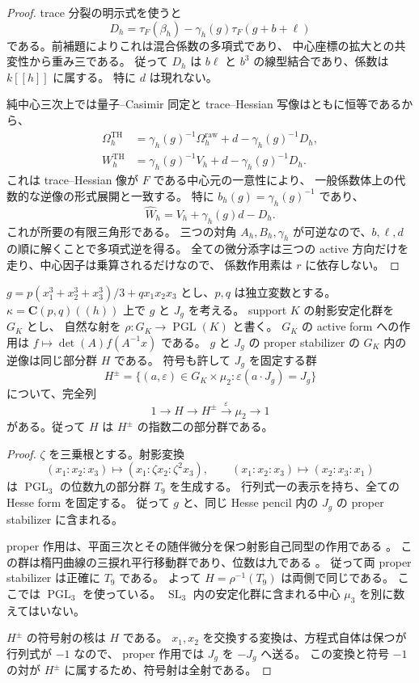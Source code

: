 \begin{proof}
trace 分裂の明示式を使うと
\[
 D_h=\tau_F(\beta_h)-\gamma_h(g)\tau_F(g+b+\ell)
\]
である。前補題によりこれは混合係数の多項式であり、
中心座標の拡大との共変性から重み三である。
従って $D_h$ は $b\ell$ と $b^3$ の線型結合であり、係数は $k[[h]]$ に属する。
特に $d$ は現れない。

純中心三次上では量子--Casimir 同定と trace--Hessian 写像はともに恒等であるから、
\[
 \begin{split}
 \Omega_h^{\mathrm{TH}}
 &=\gamma_h(g)^{-1}\Omega_h^{\mathrm{raw}}+d-\gamma_h(g)^{-1}D_h,\\
 W_h^{\mathrm{TH}}
 &=\gamma_h(g)^{-1}V_h+d-\gamma_h(g)^{-1}D_h.
 \end{split}
\]
これは trace--Hessian 像が $F$ である中心元の一意性により、
一般係数体上の代数的な逆像の形式展開と一致する。
特に $b_h(g)=\gamma_h(g)^{-1}$ であり、
\[
 \widehat W_h=V_h+\gamma_h(g)d-D_h.
\]
これが所要の有限三角形である。
三つの対角 $A_h,B_h,\gamma_h$ が可逆なので、$b,\ell,d$ の順に解くことで多項式逆を得る。
全ての微分添字は三つの active 方向だけを走り、中心因子は乗算されるだけなので、
係数作用素は $r$ に依存しない。
\end{proof}

\begin{lemma}
\label{lem:nfm-hesse-stabilizer-index-two}
$g=p(x_1^3+x_2^3+x_3^3)/3+qx_1x_2x_3$ とし、$p,q$ は独立変数とする。
$\kappa=\mathbf C(p,q)((h))$ 上で $g$ と $J_g$ を考える。
support $K$ の射影安定化群を $G_K$ とし、
自然な射を $\rho:G_K\to\operatorname{PGL}(K)$ と書く。
$G_K$ の active form への作用は $f\mapsto\det(A)f(A^{-1}x)$ である。
$g$ と $J_g$ の proper stabilizer の $G_K$ 内の逆像は同じ部分群 $H$ である。
符号も許して $J_g$ を固定する群
\[
 H^\pm=\{(a,\varepsilon)\in G_K\times\mu_2:
                 \varepsilon(a\cdot J_g)=J_g\}
\]
について、完全列
\[
 1\longrightarrow H\longrightarrow H^\pm
   \xrightarrow{\varepsilon}\mu_2\longrightarrow1
\]
がある。従って $H$ は $H^\pm$ の指数二の部分群である。
\end{lemma}

\begin{proof}
$\zeta$ を三乗根とする。射影変換
\[
 (x_1:x_2:x_3)\longmapsto(x_1:\zeta x_2:\zeta^2x_3),\qquad
 (x_1:x_2:x_3)\longmapsto(x_2:x_3:x_1)
\]
は $\operatorname{PGL}_3$ の位数九の部分群 $T_9$ を生成する。
行列式一の表示を持ち、全ての Hesse form を固定する。
従って $g$ と、同じ Hesse pencil 内の $J_g$ の proper stabilizer に含まれる。

proper 作用は、平面三次とその随伴微分を保つ射影自己同型の作用である
\cite[Theorem~2.5 and Lemma~2.6]{NFMFisherTernary}。
この群は楕円曲線の三捩れ平行移動群であり、位数は九である
\cite[proof of Lemma~2.3]{NFMFisherTernary}。
従って両 proper stabilizer は正確に $T_9$ である。
よって $H=\rho^{-1}(T_9)$ は両側で同じである。
ここでは $\operatorname{PGL}_3$ を使っている。
$\operatorname{SL}_3$ 内の安定化群に含まれる中心 $\mu_3$ を別に数えてはいない。

$H^\pm$ の符号射の核は $H$ である。
$x_1,x_2$ を交換する変換は、方程式自体は保つが行列式が $-1$ なので、
proper 作用では $J_g$ を $-J_g$ へ送る。
この変換と符号 $-1$ の対が $H^\pm$ に属するため、符号射は全射である。
\end{proof}

